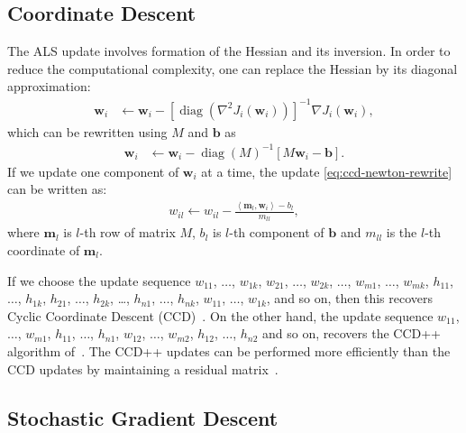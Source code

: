 \documentclass{vldb}
\newcommand{\bb}{\mathbf{b}}
\newcommand{\mb}{\mathbf{m}}
\newcommand{\wb}{\mathbf{w}}
\newcommand{\diag}{\mathop{\mathrm{diag}}}
\newcommand{\rbr}[1]{\left(#1\right)}
\newcommand{\sbr}[1]{\left[#1\right]}
\newcommand{\inner}[2]{\left\langle #1,#2 \right\rangle}
\begin{document}
\subsection{Coordinate Descent}
\label{sec:CoordinateDescent}

The ALS update involves formation of the Hessian and its inversion.  In
order to reduce the computational complexity, one can replace the
Hessian by its diagonal approximation:
\begin{align}
  \label{eq:ccd-newton}
  \wb_{i} & \leftarrow 
  \wb_{i} -
  \sbr{\diag\rbr{\nabla^{2} J_{i}\rbr{\wb_{i}}}}^{-1} \nabla
  J_{i}\rbr{\wb_{i}},
\end{align}
which can be rewritten using $M$ and $\bb$ as 
\begin{align}
  \label{eq:ccd-newton-rewrite}
  \wb_{i} & \leftarrow \wb_{i} - \diag(M)^{-1} \sbr{M \wb_{i} - \bb}.
\end{align}
If we update one component of $\wb_i$ at a time, the update
\eqref{eq:ccd-newton-rewrite} can be written as:
\begin{align}
  \label{eq:ccd-coord-update}
  w_{il} \leftarrow w_{il} - \frac{\inner{\mb_{l}}{\wb_{i}} -
    b_{l}}{m_{ll}},
\end{align}
where $\mb_{l}$ is $l$-th row of matrix $M$, $b_{l}$ is $l$-th component
of $\bb$ and $m_{ll}$ is the $l$-th coordinate of $\mb_{l}$.

If we choose the update sequence $w_{11}$, $\ldots$, $w_{1k}$, $w_{21}$,
$\ldots$, $w_{2k}$, $\ldots$, $w_{m1}$, $\ldots$, $w_{mk}$, $h_{11}$,
$\ldots$, $h_{1k}$, $h_{21}$, $\ldots$, $h_{2k}$, \ldots, $h_{n1}$,
$\ldots$, $h_{nk}$, $w_{11}$, $\ldots$, $w_{1k}$, and so on, then this
recovers Cyclic Coordinate Descent (CCD)~\cite{HsiDhi11}. On the other
hand, the update sequence $w_{11}$, $\ldots$, $w_{m1}$, $h_{11}$,
$\ldots$, $h_{n1}$, $w_{12}$, $\ldots$, $w_{m2}$, $h_{12}$, $\ldots$,
$h_{n2}$ and so on, recovers the CCD++ algorithm
of~\citet{YuHsiSiDhi12}. The CCD++ updates can be performed more
efficiently than the CCD updates by maintaining a residual
matrix~\citep{YuHsiSiDhi12}.

\subsection{Stochastic Gradient Descent}
\label{sec:StochGradDesc}
\end{document}
